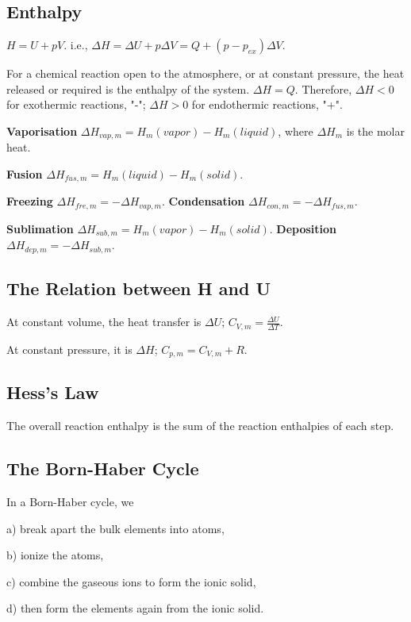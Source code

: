 \documentclass[a4paper,12pt]{article}
\begin{document}
\subsection{Enthalpy}
$H = U + pV$. i.e., $\Delta H =\Delta U + p\Delta V=Q+(p-p_{ex})\Delta V$.\par
For a chemical reaction open to the atmosphere, or at constant pressure, the heat released or required is the enthalpy of the system. $\Delta H=Q$. Therefore, $\Delta H<0$ for exothermic reactions, "-"; $\Delta H>0$ for endothermic reactions, "+".\par
\textbf{Vaporisation} $\Delta H_{vap,m} = H_{m}(vapor) - H_{m}(liquid)$, where $\Delta H_{m}$ is the molar heat.\par
\textbf{Fusion} $\Delta H_{fus,m} = H_{m}(liquid) - H_{m}(solid)$.\par
\textbf{Freezing} $\Delta H_{fre,m} =-\Delta H_{vap,m}$. \textbf{Condensation} $\Delta H_{con,m} =-\Delta H_{fus,m}$.\par
\textbf{Sublimation}  $\Delta H_{sub,m} = H_{m}(vapor) - H_{m}(solid)$. \textbf{Deposition}  $\Delta H_{dep,m} = -\Delta H_{sub,m}$.
\subsection{The Relation between H and U}
At constant volume, the heat transfer is $\Delta U$; $C_{V,m}=\frac{ \Delta U}{\Delta T}$.\par
At constant pressure, it is $\Delta H$; $C_{p,m} = C_{V,m} + R$.\par
\subsection{Hess’s Law}
The overall reaction enthalpy is the sum of the reaction enthalpies of each step.
\subsection{The Born-Haber Cycle}
In a Born-Haber cycle, we\par
a) break apart the bulk elements into atoms,\par
b) ionize the atoms,\par
c) combine the gaseous ions to form the ionic solid,\par
d) then form the elements again from the ionic solid.

\newpage
\end{document}
